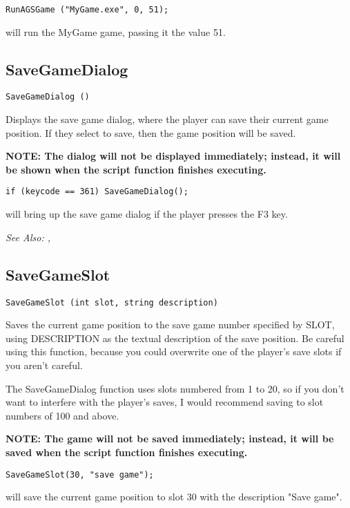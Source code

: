 \begin{verbatim}
RunAGSGame ("MyGame.exe", 0, 51);
\end{verbatim}
will run the MyGame game, passing it the value 51.


\subsection{SaveGameDialog}\label{SaveGameDialog}%

\begin{verbatim}
SaveGameDialog ()
\end{verbatim}
Displays the save game dialog, where the player can save their current
game position. If they select to save, then the game position will be saved.

\bf{NOTE:} The dialog will not be displayed immediately; instead, it will be
shown when the script function finishes executing.

\begin{verbatim}
if (keycode == 361) SaveGameDialog();
\end{verbatim}
will bring up the save game dialog if the player presses the F3 key.

\it{See Also:} , 


\subsection{SaveGameSlot}\label{SaveGameSlot}%

\begin{verbatim}
SaveGameSlot (int slot, string description)
\end{verbatim}
Saves the current game position to the save game number specified by SLOT,
using DESCRIPTION as the textual description of the save position.
Be careful using this function, because you could overwrite one of the
player's save slots if you aren't careful.

The SaveGameDialog function uses slots numbered from 1 to 20, so if you
don't want to interfere with the player's saves, I would recommend saving
to slot numbers of 100 and above.

\bf{NOTE:} The game will not be saved immediately; instead, it will be
saved when the script function finishes executing.

\begin{verbatim}
SaveGameSlot(30, "save game");
\end{verbatim}
will save the current game position to slot 30 with the description "Save game".

